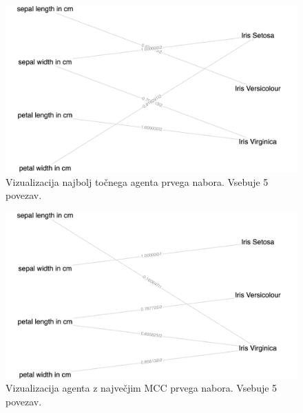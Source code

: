 \begin{figure}[H]
    \begin{center}
        \includegraphics[width=13cm]{iris/1/acc_g}
    \end{center}
    \caption{Vizualizacija najbolj točnega agenta prvega nabora. Vsebuje 5 povezav.}
    \label{fig:iris_acc_1_g}
\end{figure}

\begin{figure}[H]
    \begin{center}
        \includegraphics[width=13cm]{iris/1/mcc_g}
    \end{center}
    \caption{Vizualizacija agenta z največjim MCC prvega nabora. Vsebuje 5 povezav.}
    \label{fig:iris_mcc_1_g}
\end{figure}

